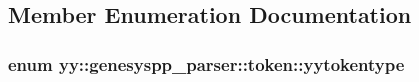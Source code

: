 \subsection{Member Enumeration Documentation}
\hypertarget{structyy_1_1genesyspp__parser_1_1token_a473652e1e69da7c38a16e5d2aaac94b9}{
\subsubsection[{yytokentype}]{\setlength{\rightskip}{0pt plus 5cm}enum {\bf yy\-::genesyspp\-\_\-parser\-::token\-::yytokentype}}}\label{structyy_1_1genesyspp__parser_1_1token_a473652e1e69da7c38a16e5d2aaac94b9}
